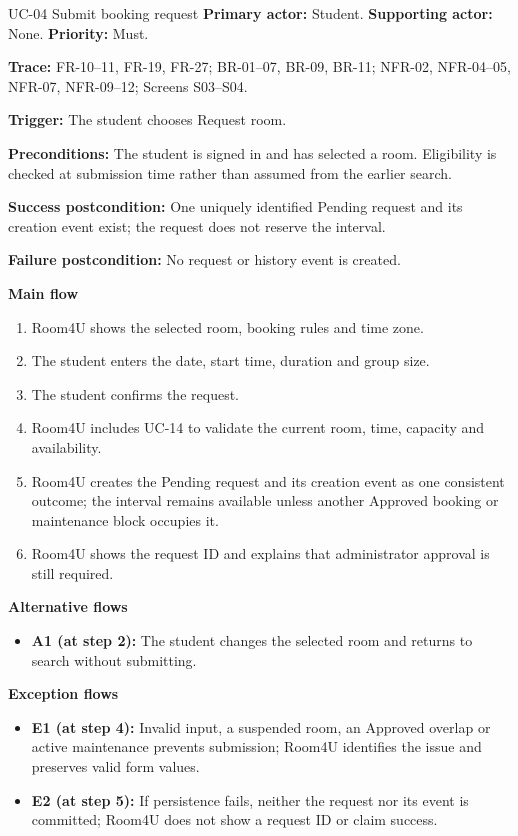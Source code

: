 \begin{usecasebox}{UC-04 Submit booking request}
\noindent\textbf{Primary actor:} Student.\quad
\textbf{Supporting actor:} None.\quad
\textbf{Priority:} Must.\par
\textbf{Trace:} FR-10--11, FR-19, FR-27; BR-01--07, BR-09, BR-11; NFR-02, NFR-04--05, NFR-07, NFR-09--12; Screens S03--S04.\par
\textbf{Trigger:} The student chooses Request room.\par
\textbf{Preconditions:} The student is signed in and has selected a room. Eligibility is checked at submission time rather than assumed from the earlier search.\par
\textbf{Success postcondition:} One uniquely identified Pending request and its creation event exist; the request does not reserve the interval.\par
\textbf{Failure postcondition:} No request or history event is created.\par
\textbf{Main flow}
\begin{enumerate}[label=\arabic*.,leftmargin=2em,itemsep=1pt,topsep=2pt]
  \item Room4U shows the selected room, booking rules and time zone.
  \item The student enters the date, start time, duration and group size.
  \item The student confirms the request.
  \item Room4U includes UC-14 to validate the current room, time, capacity and availability.
  \item Room4U creates the Pending request and its creation event as one consistent outcome; the interval remains available unless another Approved booking or maintenance block occupies it.
  \item Room4U shows the request ID and explains that administrator approval is still required.
\end{enumerate}
\textbf{Alternative flows}
\begin{itemize}[label={},leftmargin=0pt,itemsep=1pt,topsep=1pt]
  \item \textbf{A1 (at step 2):} The student changes the selected room and returns to search without submitting.
\end{itemize}
\textbf{Exception flows}
\begin{itemize}[label={},leftmargin=0pt,itemsep=1pt,topsep=1pt]
  \item \textbf{E1 (at step 4):} Invalid input, a suspended room, an Approved overlap or active maintenance prevents submission; Room4U identifies the issue and preserves valid form values.
  \item \textbf{E2 (at step 5):} If persistence fails, neither the request nor its event is committed; Room4U does not show a request ID or claim success.
\end{itemize}
\end{usecasebox}

